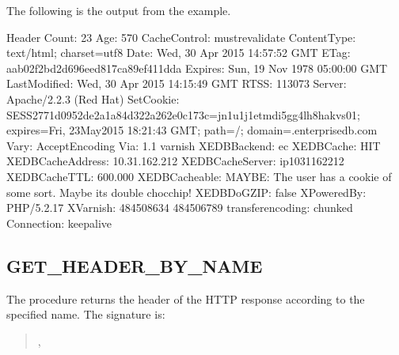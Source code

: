 \documentclass[letterpaper,10pt,english,openany,oneside]{sphinxmanual}
\begin{document}
The following is the output from the example.

%
\begin{sphinxVerbatim}[commandchars=\\\{\}]
Header Count: 23
Age: 570
Cache\PYGZhy{}Control: must\PYGZhy{}revalidate
Content\PYGZhy{}Type: text/html; charset=utf\PYGZhy{}8
Date: Wed, 30 Apr 2015 14:57:52 GMT
ETag: \PYGZdq{}aab02f2bd2d696eed817ca89ef411dda\PYGZdq{}
Expires: Sun, 19 Nov 1978 05:00:00 GMT
Last\PYGZhy{}Modified: Wed, 30 Apr 2015 14:15:49 GMT
RTSS: 1\PYGZhy{}1307\PYGZhy{}3
Server: Apache/2.2.3 (Red Hat)
Set\PYGZhy{}Cookie: SESS2771d0952de2a1a84d322a262e0c173c=jn1u1j1etmdi5gg4lh8hakvs01; expires=Fri, 23\PYGZhy{}May\PYGZhy{}2015 18:21:43 GMT; path=/; domain=.enterprisedb.com
Vary: Accept\PYGZhy{}Encoding
Via: 1.1 varnish
X\PYGZhy{}EDB\PYGZhy{}Backend: ec
X\PYGZhy{}EDB\PYGZhy{}Cache: HIT
X\PYGZhy{}EDB\PYGZhy{}Cache\PYGZhy{}Address: 10.31.162.212
X\PYGZhy{}EDB\PYGZhy{}Cache\PYGZhy{}Server: ip\PYGZhy{}10\PYGZhy{}31\PYGZhy{}162\PYGZhy{}212
X\PYGZhy{}EDB\PYGZhy{}Cache\PYGZhy{}TTL: 600.000
X\PYGZhy{}EDB\PYGZhy{}Cacheable: MAYBE: The user has a cookie of some sort. Maybe it\PYGZsq{}s double choc\PYGZhy{}chip!
X\PYGZhy{}EDB\PYGZhy{}Do\PYGZhy{}GZIP: false
X\PYGZhy{}Powered\PYGZhy{}By: PHP/5.2.17
X\PYGZhy{}Varnish: 484508634 484506789
transfer\PYGZhy{}encoding: chunked
Connection: keep\PYGZhy{}alive
\end{sphinxVerbatim}

\newpage


\subsection{GET\_HEADER\_BY\_NAME}
\label{\detokenize{utl_http:get-header-by-name}}
The  procedure returns the header of the HTTP
response according to the specified name. The signature is:
\begin{quote}

\begin{DUlineblock}{0em}
\item[] ,
\item[] 
\end{DUlineblock}
\end{quote}
\end{document}
